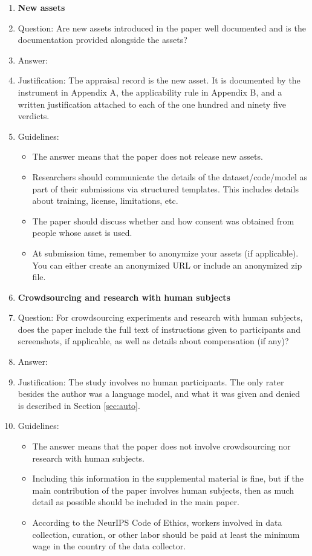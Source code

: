 \documentclass{article}
\begin{document}
\begin{enumerate}
\item {\bf New assets}
    \item[] Question: Are new assets introduced in the paper well documented and is the documentation provided alongside the assets?
    \item[] Answer: \answerYes{}
    \item[] Justification: The appraisal record is the new asset. It is documented by the instrument in Appendix A, the applicability rule in Appendix B, and a written justification attached to each of the one hundred and ninety five verdicts.
    \item[] Guidelines:
    \begin{itemize}
        \item The answer \answerNA{} means that the paper does not release new assets.
        \item Researchers should communicate the details of the dataset\slash code\slash model as part of their submissions via structured templates. This includes details about training, license, limitations, etc. 
        \item The paper should discuss whether and how consent was obtained from people whose asset is used.
        \item At submission time, remember to anonymize your assets (if applicable). You can either create an anonymized URL or include an anonymized zip file.
    \end{itemize}

\item {\bf Crowdsourcing and research with human subjects}
    \item[] Question: For crowdsourcing experiments and research with human subjects, does the paper include the full text of instructions given to participants and screenshots, if applicable, as well as details about compensation (if any)? 
    \item[] Answer: \answerNA{}
    \item[] Justification: The study involves no human participants. The only rater besides the author was a language model, and what it was given and denied is described in Section \ref{sec:auto}.
    \item[] Guidelines:
    \begin{itemize}
        \item The answer \answerNA{} means that the paper does not involve crowdsourcing nor research with human subjects.
        \item Including this information in the supplemental material is fine, but if the main contribution of the paper involves human subjects, then as much detail as possible should be included in the main paper. 
        \item According to the NeurIPS Code of Ethics, workers involved in data collection, curation, or other labor should be paid at least the minimum wage in the country of the data collector. 
    \end{itemize}


\end{enumerate}
\end{document}
